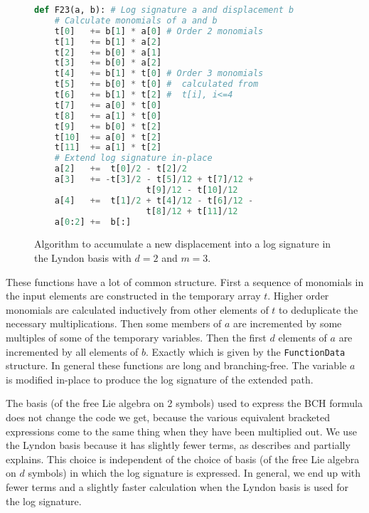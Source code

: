 \begin{figure}[H]
\begin{lrbox}{\Lst}
\begin{lstlisting}[language=Python]
def F23(a, b): # Log signature a and displacement b
    # Calculate monomials of a and b
    t[0]   += b[1] * a[0] # Order 2 monomials 
    t[1]   += b[1] * a[2]
    t[2]   += b[0] * a[1]
    t[3]   += b[0] * a[2]
    t[4]   += b[1] * t[0] # Order 3 monomials 
    t[5]   += b[0] * t[0] #  calculated from
    t[6]   += b[1] * t[2] #  t[i], i<=4
    t[7]   += a[0] * t[0]
    t[8]   += a[1] * t[0]
    t[9]   += b[0] * t[2]
    t[10]  += a[0] * t[2]
    t[11]  += a[1] * t[2]
    # Extend log signature in-place
    a[2]   +=  t[0]/2 - t[2]/2
    a[3]   += -t[3]/2 - t[5]/12 + t[7]/12 + 
                      t[9]/12 - t[10]/12
    a[4]   +=  t[1]/2 + t[4]/12 - t[6]/12 - 
                      t[8]/12 + t[11]/12
    a[0:2] +=  b[:]
\end{lstlisting}
\end{lrbox}
\begin{center}
\fbox{\usebox{\Lst}}
\end{center}
\caption[Pseudocode to concatenate a displacement onto a level 3 log signature.]{\label{fig:F23}Algorithm to accumulate a new displacement into a log signature in the Lyndon basis with $d=2$ and $m=3$.}
\end{figure}
These functions have a lot of common structure. First a sequence of monomials in the input elements are constructed in the temporary array $t$. Higher order monomials are calculated inductively from other elements of $t$ to deduplicate the necessary multiplications.
Then some members of $a$ are incremented by some multiples of some of the temporary variables. Then the first $d$ elements of $a$ are incremented by all elements of $b$. Exactly which is given by the \verb|FunctionData| structure.
In general these functions are long and branching-free. The variable $a$ is modified in-place to produce the log signature of the extended path.

The basis (of the free Lie algebra on 2 symbols) used to express the BCH formula does not change the code we get, because the various equivalent bracketed expressions come to the same thing when they have been multiplied out. We use the Lyndon basis because it has slightly fewer terms, as \cite{bch} describes and partially explains. This choice is independent of the choice of basis (of the free Lie algebra on $d$ symbols) in which the log signature is expressed.
In general, we end up with fewer terms and a slightly faster calculation when the Lyndon basis is used for the log signature.


